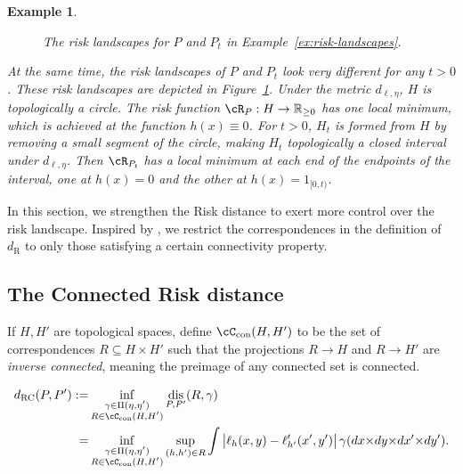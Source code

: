 \documentclass[twoside,11pt]{article}
\newtheorem{examples}[theorem]{Example}
\newcommand{\dexp}[1][]{d_{\mathrm{R}#1}}
\newcommand{\dexpcon}[1][]{d_{\operatorname{RC}#1}}
\DeclareMathOperator{\dis}{dis}
\newcommand{\con}{\cC_{\mathrm{con}}}%
\begin{document}
\begin{examples}
\begin{figure}

        \caption{The risk landscapes for $P$ and $P_t$ in Example~\ref{ex:risk-landscapes}.}\label{fig:risk-landscape-example}
    \end{figure}
    At the same time, the risk landscapes of $P$ and $P_t$ look very different for any $t>0$. These risk landscapes are depicted in Figure~\ref{fig:risk-landscape-example}. Under the metric $d_{\ell,\eta}$, $H$ is topologically a circle. The risk function $\cR_P:H \to \mathbb R_{\geq 0}$ has one local minimum, which is achieved at the function $h(x) \equiv 0$. For $t>0$, $H_t$ is formed from $H$ by removing a small segment of the circle, making $H_t$ topologically a closed interval under $d_{\ell,\eta}$. Then $\cR_{P_t}$ has a local minimum at each end of the endpoints of the interval, one at $h(x)=0$ and the other at $h(x) = 1_{[0,t)}$.
\end{examples}




In this section, we strengthen the Risk distance to exert more control over the risk landscape. Inspired by \citet{bauer_reeb_2021}, we restrict the correspondences in the definition of $\dexp$ to only those satisfying a certain connectivity property.
\subsection{The Connected Risk distance}
    If $H,H'$ are topological spaces, define $\con(H,H')$ to be the set of correspondences $R\subseteq H\times H'$ such that the projections $R\to H$ and $R\to H'$ are \emph{inverse connected}, meaning the preimage of any connected set is connected.
    \begin{definition}
        \begin{align*}\dexpcon(P,P')
        :=&
        \inf_{\substack{\gamma \in \Pi(\eta,\eta')\\ R\in \con(H,H')}} \dis_{P,P'}(R,\gamma)
        \\ =&
        \inf_{\substack{\gamma \in \Pi(\eta,\eta')\\ R\in \con(H,H')}} \sup_{(h,h')\in R}
        \int \big| \ell_h(x,y) - \ell'_{h'}(x',y')\big| \, \gamma(dx{\times} dy{\times} dx'{\times} dy').
        \end{align*}
    \end{definition}
   
\end{document}
